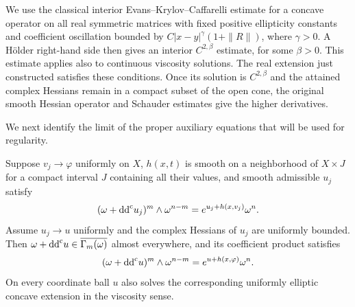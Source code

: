 We use the classical interior Evans--Krylov--Caffarelli estimate for a
concave operator on all real symmetric matrices with fixed positive
ellipticity constants and coefficient oscillation bounded by
$C|x-y|^\gamma(1+\|R\|)$, where $\gamma>0$. A H\"older right-hand side
then gives an interior $C^{2,\beta}$ estimate, for some $\beta>0$.
This estimate applies also to continuous viscosity solutions. The real
extension just constructed satisfies these conditions. Once its solution
is $C^{2,\beta}$ and the attained complex Hessians remain in a compact
subset of the open cone, the original smooth Hessian operator and
Schauder estimates give the higher derivatives.

We next identify the limit of the proper auxiliary equations that will
be used for regularity.

\begin{proposition}\label{hessian:proper-auxiliary-limit}
Suppose $v_j\to\varphi$ uniformly on $X$, $h(x,t)$ is smooth on a
neighborhood of $X\times J$ for a compact interval $J$ containing all
their values, and smooth admissible $u_j$ satisfy
\[
 (\omega+\mathrm{dd}^{\mathrm{c}} u_j)^m\wedge\omega^{n-m}
           =e^{u_j+h(x,v_j)}\omega^n.
\]
Assume $u_j\to u$ uniformly and the complex Hessians of $u_j$ are uniformly
bounded. Then $\omega+\mathrm{dd}^{\mathrm{c}} u\in\overline{\Gamma_m(\omega)}$ almost everywhere, and
its coefficient product satisfies
\[
 (\omega+\mathrm{dd}^{\mathrm{c}} u)^m\wedge\omega^{n-m}
           =e^{u+h(x,\varphi)}\omega^n.
\]
On every coordinate ball $u$ also solves the corresponding uniformly
elliptic concave extension in the viscosity sense.
\end{proposition}
